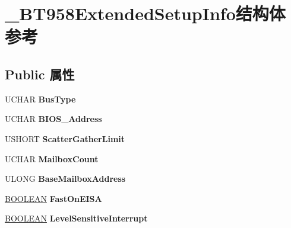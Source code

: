 \hypertarget{struct___b_t958_extended_setup_info}{}\section{\+\_\+\+B\+T958\+Extended\+Setup\+Info结构体 参考}
\label{struct___b_t958_extended_setup_info}
\subsection*{Public 属性}
\begin{DoxyCompactItemize}
\item 
\mbox{\label{struct___b_t958_extended_setup_info_aec7eb4b5405f4b72e640a74d9d48cf3f}} 
U\+C\+H\+AR {\bfseries Bus\+Type}
\item 
\mbox{\label{struct___b_t958_extended_setup_info_a4a08c2f29adc6bb036b24564a9f8b440}} 
U\+C\+H\+AR {\bfseries B\+I\+O\+S\+\_\+\+Address}
\item 
\mbox{\label{struct___b_t958_extended_setup_info_a250dbad5d102e3bf31b80455cb6a2b2f}} 
U\+S\+H\+O\+RT {\bfseries Scatter\+Gather\+Limit}
\item 
\mbox{\label{struct___b_t958_extended_setup_info_a9e1badeed16b969986aebe673cbbf80a}} 
U\+C\+H\+AR {\bfseries Mailbox\+Count}
\item 
\mbox{\label{struct___b_t958_extended_setup_info_afe97e76c667db81501f9b97c3c946bd2}} 
U\+L\+O\+NG {\bfseries Base\+Mailbox\+Address}
\item 
\mbox{\label{struct___b_t958_extended_setup_info_a8decc986c949f554d50874ed9b703bc3}} 
\hyperlink{_processor_bind_8h_a112e3146cb38b6ee95e64d85842e380a}{B\+O\+O\+L\+E\+AN} {\bfseries Fast\+On\+E\+I\+SA}
\item 
\mbox{\label{struct___b_t958_extended_setup_info_a019f4e81aeca9f46fd6f38ce37dbcf8b}} 
\hyperlink{_processor_bind_8h_a112e3146cb38b6ee95e64d85842e380a}{B\+O\+O\+L\+E\+AN} {\bfseries Level\+Sensitive\+Interrupt}

\end{DoxyCompactItemize}
